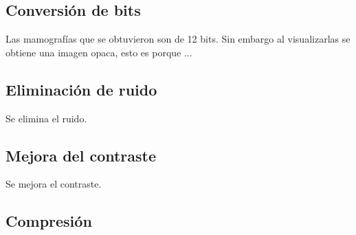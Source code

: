 \subsection{Conversión de bits}

Las mamografías que se obtuvieron son de 12 bits. Sin embargo al visualizarlas
se obtiene una imagen opaca, esto es porque ...

\subsection{Eliminación de ruido}
Se elimina el ruido.

\subsection{Mejora del contraste}
Se mejora el contraste.

\subsection{Compresión} \label{compression}

